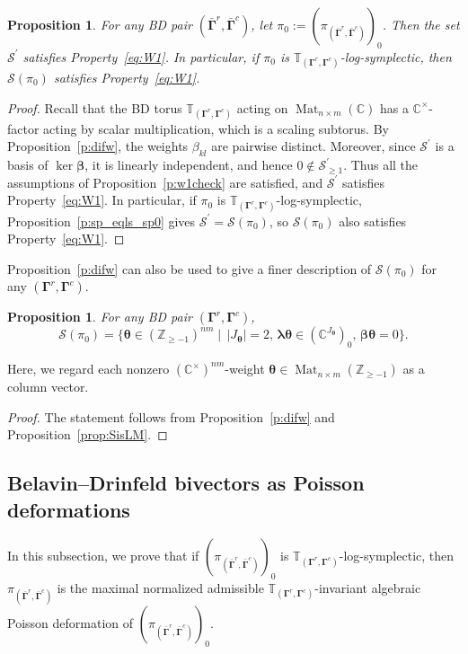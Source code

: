 \documentclass[11pt]{article}
\newcommand{\bbeta}{\boldsymbol{\beta}}
\newcommand{\blambda}{\boldsymbol{\lambda}}
\newcommand{\btheta}{{\boldsymbol{\theta}}}
\newcommand{\bbg}{\bar{\mathbf{\Gamma}}}
\newcommand{\bg}{\mathbf{\Gamma}}
\DeclareMathOperator{\Mat}{Mat}
\newtheorem{proposition}[theorem]{Proposition}%
\theoremstyle{definition}\newtheorem{definition}[theorem]{Definition}
\theoremstyle{definition}\newtheorem{remark}[theorem]{Remark}
\theoremstyle{remark}
\numberwithin{equation}{section}
\begin{document}
\begin{proposition}\label{p:BD_W1}
    For any BD pair $(\bbg^r,\bbg^c)$, let $\pi_0 := (\pi_{(\bbg^r,\bbg^c)})_0$. Then the set $\mathcal{S}^\prime$ satisfies Property~\eqref{eq:W1}. In particular, if $\pi_0$ is $\mathbb{T}_{(\bg^r,\bg^c)}$-log-symplectic, then $\mathcal{S}(\pi_0)$ satisfies Property~\eqref{eq:W1}.
\end{proposition}
\begin{proof}
    Recall that the BD torus $\mathbb{T}_{(\bg^r,\bg^c)}$ acting on $\Mat_{n\times m}(\mathbb{C})$ has a  $\mathbb{C}^\times$-factor acting by scalar multiplication, which is a scaling subtorus. By Proposition~\ref{p:difw}, the weights $\beta_{kl}$ are pairwise distinct. Moreover, since $\mathcal{S}^\prime$ is a basis of $\ker\bbeta$, it is linearly independent, and hence $0 \notin \mathcal{S}^\prime_{\geq 1}$. Thus all the assumptions of Proposition~\ref{p:w1check} are satisfied, and $\mathcal{S}^\prime$ satisfies Property~\eqref{eq:W1}. In particular, if $\pi_0$ is $\mathbb{T}_{(\bg^r,\bg^c)}$-log-symplectic, Proposition~\ref{p:sp_eqls_sp0} gives $\mathcal{S}^\prime = \mathcal{S}(\pi_0)$, so $\mathcal{S}(\pi_0)$ also satisfies Property~\eqref{eq:W1}.
\end{proof}

Proposition~\ref{p:difw} can also be used to give a finer description of $\mathcal{S}(\pi_0)$ for any $(\bg^r,\bg^c)$.
\begin{proposition}
    For any BD pair $(\bg^r,\bg^c)$, 
    \begin{equation*}
        \mathcal{S}(\pi_0)  = \{\btheta \in (\mathbb{Z}_{\geq -1})^{nm}\mid \,|J_{\btheta}|=2, \, \blambda \btheta \in (\mathbb{C}^{J_{\btheta}})_0, \, \bbeta 
        \btheta = 0\}.
    \end{equation*}
\end{proposition}
Here, we regard each nonzero $(\mathbb{C}^\times)^{nm}$-weight $\btheta \in \Mat_{n\times m}(\mathbb{Z}_{\geq -1})$ as a column vector.
\begin{proof}
    The statement follows from Proposition~\ref{p:difw} and Proposition~\ref{prop:SisLM}.
\end{proof}

\subsection{Belavin--Drinfeld bivectors as Poisson deformations}\label{s:pi0_piBD}

In this subsection, we prove that if $(\pi_{(\bbg^r,\bbg^c)})_0$ is $\mathbb{T}_{(\bg^r,\bg^c)}$-log-symplectic, then $\pi_{(\bbg^r,\bbg^c)}$ is the maximal normalized admissible $\mathbb{T}_{(\bg^r,\bg^c)}$-invariant algebraic Poisson deformation of $(\pi_{(\bbg^r,\bbg^c)})_0$.
\end{document}

